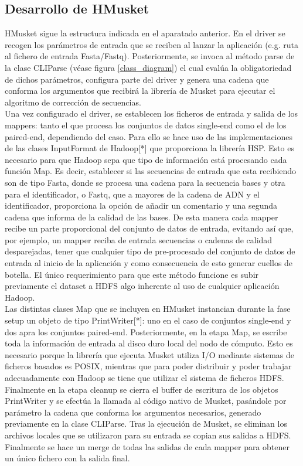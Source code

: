 \documentclass[conference]{IEEEtran}
\begin{document}
\subsection{Desarrollo de HMusket}
HMusket sigue la estructura indicada en el aparatado anterior. En el driver se recogen los parámetros de entrada que se reciben al lanzar la aplicación (e.g. ruta al fichero de entrada Fasta/Fastq). Posteriormente, se invoca al método parse de la clase CLIParse (véase figura \ref{class_diagram}) el cual evalúa la obligatoriedad de dichos parámetros, configura parte del driver y genera una cadena que conforma los argumentos que recibirá la librería de Musket para ejecutar el algoritmo de corrección de secuencias.\\
Una vez configurado el driver, se establecen los ficheros de entrada y salida de los mappers: tanto el que procesa los conjuntos de datos single-end como el de los paired-end, dependiendo del caso. Para ello se hace uso de las implementaciones de las clases InputFormat de Hadoop[*] que proporciona la librería HSP. Esto es necesario para que Hadoop sepa que tipo de información está procesando cada función Map. Es decir, establecer si las secuencias de entrada que esta recibiendo son de tipo Fasta, donde se procesa una cadena para la secuencia bases y otra para el identificador, o Fastq, que a mayores de la cadena de ADN y el identificador, proporciona la opción de añadir un comentario y una segunda cadena que informa de la calidad de las bases. De esta manera cada mapper recibe un parte proporcional del conjunto de datos de entrada, evitando así que, por ejemplo, un mapper reciba de entrada secuencias o cadenas de calidad desparejadas, tener que cualquier tipo de pre-procesado del conjunto de datos de entrada al inicio de la aplicación y como consecuencia de esto generar cuellos de botella. El único requerimiento para que este método funcione es subir previamente el dataset a HDFS algo inherente al uso de cualquier aplicación Hadoop.\\

Las distintas clases Map que se incluyen en HMusket instancian durante la fase setup un objeto de tipo PrintWriter[*]: uno en el caso de conjuntos single-end y dos apra los conjuntos paired-end. Posteriormente, en la etapa Map, se escribe toda la información de entrada al disco duro local del nodo de cómputo. Esto es necesario porque la librería que ejecuta Musket utiliza I/O mediante sistemas de ficheros basados es POSIX, mientras que para poder distribuir y poder trabajar adecuadamente con Hadoop se tiene que utilizar el sistema de ficheros HDFS.\\
Finalmente en la etapa cleanup se cierra el buffer de escritura de los objetos PrintWriter y se efectúa la llamada al código nativo de Musket, pasándole por parámetro la cadena que conforma los argumentos necesarios, generado previamente en la clase CLIParse. Tras la ejecución de Musket, se eliminan los archivos locales que se utilizaron para su entrada se copian sus salidas a HDFS. Finalmente se hace un merge de todas las salidas de cada mapper para obtener un único fichero con la salida final.\\
\end{document}

